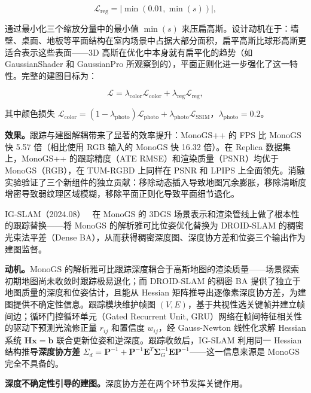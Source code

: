 \begin{equation*}
\mathcal{L}_{\mathrm{reg}} = |\min(0.01, \min(s))|,
\end{equation*}

通过最小化三个缩放分量中的最小值 $\min(s)$ 来压扁高斯。设计动机在于：墙壁、桌面、地板等平面结构在室内场景中占据大部分面积，扁平高斯比球形高斯更适合表示这些表面——3D 高斯在优化中本身就有扁平化的趋势（如 GaussianShader 和 GaussianPro 所观察到的），平面正则化进一步强化了这一特性。完整的建图目标为：

\begin{equation*}
\mathcal{L} = \lambda_{\mathrm{color}}\mathcal{L}_{\mathrm{color}} + \lambda_{\mathrm{reg}}\mathcal{L}_{\mathrm{reg}},
\end{equation*}

其中颜色损失 $\mathcal{L}_{\mathrm{color}} = (1-\lambda_{\mathrm{photo}})\mathcal{L}_{\mathrm{photo}} + \lambda_{\mathrm{photo}}\mathcal{L}_{\mathrm{SSIM}}$，$\lambda_{\mathrm{photo}} = 0.2$。

\textbf{效果。}跟踪与建图解耦带来了显著的效率提升：MonoGS++ 的 FPS 比 MonoGS 快 5.57 倍（相比使用 RGB 输入的 MonoGS 快 16.32 倍）。在 Replica 数据集上，MonoGS++ 的跟踪精度（ATE RMSE）和渲染质量（PSNR）均优于 MonoGS（RGB），在 TUM-RGBD 上同样在 PSNR 和 LPIPS 上全面领先。消融实验验证了三个新组件的独立贡献：移除动态插入导致地图冗余膨胀，移除清晰度增密导致弱纹理区域模糊，移除平面正则化导致平面细节退化。

IG-SLAM（2024.08）~\cite{2408_01126} 在 MonoGS 的 3DGS 场景表示和渲染管线上做了根本性的跟踪替换——将 MonoGS 的解析雅可比位姿优化替换为 DROID-SLAM 的稠密光束法平差（Dense BA），从而获得稠密深度图、深度协方差和位姿三个输出作为建图监督。

\textbf{动机。}MonoGS 的解析雅可比跟踪深度耦合于高斯地图的渲染质量——场景探索初期地图尚未收敛时跟踪极易退化；而 DROID-SLAM 的稠密 BA 提供了独立于地图质量的深度和位姿估计，且能从 Hessian 矩阵推导出逐像素深度协方差，为建图提供不确定性信息。跟踪模块维护帧图 $(V, E)$，基于共视性选关键帧并建立帧间边；循环门控循环单元（Gated Recurrent Unit, GRU）网络在帧间特征相关性的驱动下预测光流修正量 $r_{ij}$ 和置信度 $w_{ij}$，经 Gauss-Newton 线性化求解 Hessian 系统 $\mathbf{Hx} = \mathbf{b}$ 联合更新位姿和逆深度。跟踪收敛后，IG-SLAM 利用同一 Hessian 结构推导\textbf{深度协方差} $\Sigma_d = \mathbf{P}^{-1} + \mathbf{P}^{-1}\mathbf{E}^T\boldsymbol{\Sigma}_G^{-1}\mathbf{E}\mathbf{P}^{-1}$——这一信息来源是 MonoGS 完全不具备的。

\textbf{深度不确定性引导的建图。}深度协方差在两个环节发挥关键作用。

